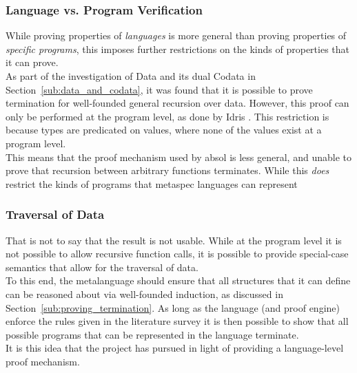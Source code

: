 \subsubsection{Language vs. Program Verification} %
\label{ssub:language_vs_program_verification}
While proving properties of \textit{languages} is more general than proving properties of \textit{specific programs}, this imposes further restrictions on the kinds of properties that it can prove. \\

As part of the investigation of Data and its dual Codata in Section~\ref{sub:data_and_codata}, it was found that it is possible to prove termination for well-founded general recursion over data. 
However, this proof can only be performed at the program level, as done by Idris \citep{idris_lang}. 
This restriction is because types are predicated on values, where none of the
values exist at a program level. \\

This means that the proof mechanism used by \gls{absol} is less general, and unable to prove that recursion between arbitrary functions terminates.
While this \textit{does} restrict the kinds of programs that metaspec languages can represent


\subsubsection{Traversal of Data} %
\label{ssub:traversal_of_data}
That is not to say that the result is not usable.
While at the program level it is not possible to allow recursive function calls, it is possible to provide special-case semantics that allow for the traversal of data. \\

To this end, the metalanguage should ensure that all structures that it can define can be reasoned about via well-founded induction, as discussed in Section~\ref{sub:proving_termination}. 
As long as the language (and proof engine) enforce the rules given in the literature survey it is then possible to show that all possible programs that can be represented in the language terminate.\\

It is this idea that the project has pursued in light of providing a language-level proof mechanism. 


